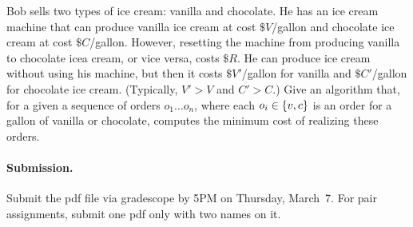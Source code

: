 \documentclass[11pt]{article}
\begin{document}

\begin{problem}
Bob sells two types of ice cream: vanilla and chocolate. He has an ice cream machine that can produce vanilla ice cream at cost $\$ V$/gallon and chocolate ice cream at cost $\$ C$/gallon. However, resetting the machine from producing vanilla to chocolate icea cream, or vice versa, costs $\$ R$.
He can produce ice cream without using his machine, but then it costs $\$ V'$/gallon for vanilla and $\$ C'$/gallon for chocolate ice cream. (Typically, $V' > V$ and $C' > C$.) Give an algorithm that, for a  given a sequence of orders $o_1\dots o_n$, where each $o_i \in{\left\{ v,c \right\} }$ is an order for a gallon of vanilla or chocolate, computes the minimum
cost of realizing these orders.
\end{problem}


\vskip 0.3in
\paragraph{Submission.}
Submit the pdf file via gradescope by 5PM on Thursday, March~7. For pair assignments, submit one pdf only with two names on it.
\end{document}

